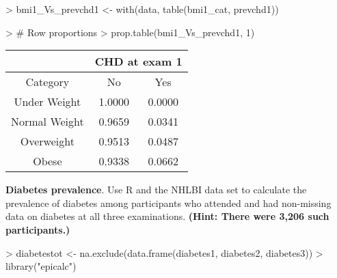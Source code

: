 \documentclass{article}
\begin{document}
\begin{enumerate}
\begin{enumerate}
\begin{Schunk}
\begin{Sinput}
> bmi1_Vs_prevchd1 <- with(data, table(bmi1_cat, prevchd1))
\end{Sinput}
\end{Schunk}
\begin{Schunk}
\begin{Sinput}
> # Row proportions
> prop.table(bmi1_Vs_prevchd1, 1)
\end{Sinput}
\end{Schunk}
\begin{table}[ht]
\begin{center}
\begin{tabular}{ccc}
& \multicolumn{2}{c}{CHD at exam 1}\\
  \hline
Category & No & Yes \\ 
  \hline
Under Weight & 1.0000 & 0.0000 \\ 
Normal Weight & 0.9659 & 0.0341 \\ 
Overweight & 0.9513 & 0.0487 \\ 
Obese & 0.9338 & 0.0662 \\ 
   \hline
\end{tabular}
\end{center}
\end{table}


\end{enumerate}


\end{enumerate}

\pagebreak
\textbf{Diabetes prevalence}. Use R and the NHLBI data set to calculate the prevalence of diabetes among participants who attended and had non-missing data on diabetes at all three examinations. \textbf{(Hint: There were 3,206 such participants.)}

\begin{Schunk}
\begin{Sinput}
> diabetestot <- na.exclude(data.frame(diabetes1, diabetes2, diabetes3))
> library("epicalc")
\end{Sinput}
\end{Schunk}
\end{document}
